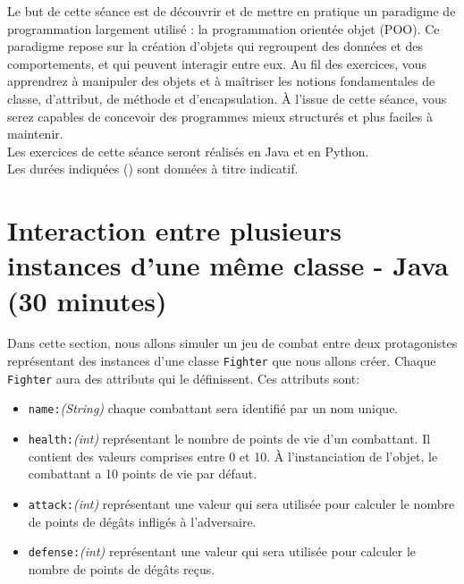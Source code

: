 




\ShowSolutiontrue
\ShowConseiltrue
\titre
{}

Le but de cette séance est de découvrir et de mettre en pratique un paradigme de programmation largement utilisé : la programmation orientée objet (POO). Ce paradigme repose sur la création d'objets qui regroupent des données et des comportements, et qui peuvent interagir entre eux. Au fil des exercices, vous apprendrez à manipuler des objets et à maîtriser les notions fondamentales de classe, d'attribut, de méthode et d'encapsulation. À l'issue de cette séance, vous serez capables de concevoir des programmes mieux structurés et plus faciles à maintenir. \\

Les exercices de cette séance seront réalisés en Java et en Python. \\

Les durées indiquées (\faClock) sont données à titre indicatif.

\section{Interaction entre plusieurs instances d'une même classe - Java (30 minutes)}

Dans cette section, nous allons simuler un jeu de combat entre deux protagonistes représentant des instances d'une classe \lstinline{Fighter} que nous allons créer.
Chaque \lstinline{Fighter} aura des attributs qui le définissent. Ces attributs sont:

\begin{itemize}
    \item \lstinline{name:}\textit{(String)} chaque combattant sera identifié par un nom unique.
    \item \lstinline{health:}\textit{(int)} représentant le nombre de points de vie d'un combattant. Il contient des valeurs comprises entre 0 et 10. À l'instanciation de l'objet, le combattant a 10 points de vie par défaut.
    \item \lstinline{attack:}\textit{(int)} représentant une valeur qui sera utilisée pour calculer le nombre de points de dégâts infligés à l'adversaire.
    \item \lstinline{defense:}\textit{(int)} représentant une valeur qui sera utilisée pour calculer le nombre de points de dégâts reçus.\\
\end{itemize}

